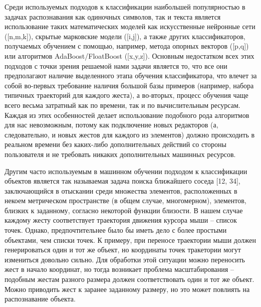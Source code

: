 \documentclass[a5paper]{article}
\begin{document}
Среди используемых подходов к классификации наибольшей популярностью в задачах распознавания как одиночных символов, так и текста является 
использование таких математических моделей как искусственные нейронные сети ([n,m,k]), скрытые марковские модели ([i,j]), а также других 
классификаторов, получаемых обучением с помощью, например, метода опорных векторов ([p,q]) или алгоритмов AdaBoost/FloatBoost ([x,y,z]). 
Основным недостатком всех этих подходов с точки зрения решаемой нами задачи является то, что все они предполагают наличие выделенного этапа 
обучения классификатора, что влечет за собой во-первых требование наличия большой базы примеров (например, набора 
типичных траекторий для каждого жеста), а во-вторых, процесс обучения чаще всего весьма затратный как по времени, так и по вычислительным 
ресурсам. Каждая из этих особенностей делает использование подобного рода алгоритмов для нас невозможным, потому как подключение новых 
редакторов (а, следовательно, и новых жестов для каждого из элементов) должно происходить в реальном времени без каких-либо дополнительных 
действий со стороны пользователя и не требовать никаких дополнительных машинных ресурсов. 

Другим часто используемым в машинном обучении подходом к классификации объектов является так называемая задача поиска ближайшего соседа 
[12, 34], заключающийся в отыскании среди множества элементов, расположенных в некоем метрическом пространстве (в общем случае, многомерном), 
элементов, близких к заданному, согласно некоторой функции близости. В нашем случае каждому жесту соответствует траектория движения курсора 
мыши -- список точек. Однако, предпочтительнее было бы иметь дело с более простыми 
объектами, чем списки точек. К примеру, при переносе траектории мыши должен генерироваться один и тот же объект, но координаты точек 
тракетории могут измениться довольно сильно. Для обработки этой ситуации можно переносить жест в начало координат, но тогда возникает проблема
масштабирования -- подобным жестам разного размера должен соответствовать один и тот же объект. Можно приводить жест к заранее 
заданному размеру, но это может повлиять на распознавание объекта.
\end{document}
